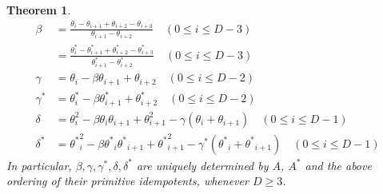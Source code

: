 \documentclass[
]{book}
\newtheorem{theorem}{Theorem}[chapter]
\theoremstyle{definition}
\theoremstyle{definition}
\theoremstyle{definition}
\theoremstyle{definition}
\theoremstyle{remark}
\begin{document}
\begin{theorem}
\begin{align}
\beta & = \frac{\theta_i-\theta_{i+1}+\theta_{i+2}-\theta_{i+3}}{\theta_{i+1}-\theta_{i+2}} \quad (0\leq i\leq D-3) \label{eq:beta}\\
& = \frac{\theta^*_i-\theta^*_{i+1}+\theta^*_{i+2}-\theta^*_{i+3}}{\theta^*_{i+1}-\theta^*_{i+2}} \quad (0\leq i\leq D-3) \label{eq:betastar}\\
\gamma & = \theta_i - \beta \theta_{i+1} + \theta_{i+2} \quad (0\leq i\leq D-2) \label{eq:gamma1}\\
\gamma^* & = \theta^*_i - \beta \theta^*_{i+1} + \theta^*_{i+2} \quad (0\leq i\leq D-2) \label{eq:gammastar}\\
\delta & = \theta^2_i - \beta \theta_i\theta_{i+1} + \theta^2_{i+1} - \gamma(\theta_i + \theta_{i+1}) \quad (0\leq i\leq D-1) \label{eq:delta}\\
\delta^* & = {\theta^*}^2_i - \beta {\theta^*}_i{\theta^*}_{i+1} + {\theta^*}^2_{i+1} - \gamma^*({\theta^*}_i + {\theta^*}_{i+1}) \quad (0\leq i\leq D-1) \label{eq:deltastar}
\end{align}
In particular, \(\beta, \gamma, \gamma^*, \delta, \delta^*\) are uniquely determined by \(A\), \(A^*\) and the above ordering of their primitive idempotents, whenever \(D\geq 3\).
\end{theorem}
\end{document}
